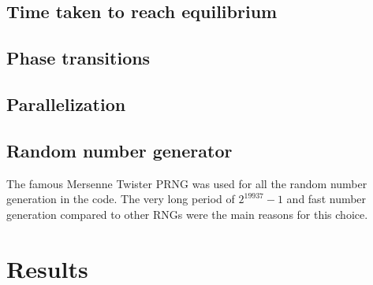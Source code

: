 \documentclass[aps,reprint]{revtex4-1}
\begin{document}
\subsection{Time taken to reach equilibrium}

\subsection{Phase transitions}

\subsection{Parallelization}

\subsection{Random number generator}
The famous Mersenne Twister PRNG was used for all the random number generation
in the code. The very long period of $2^{19937} - 1$ and fast number generation
compared to other RNGs were the main reasons for this choice.
\section{Results} \label{sec:results}
\end{document}
